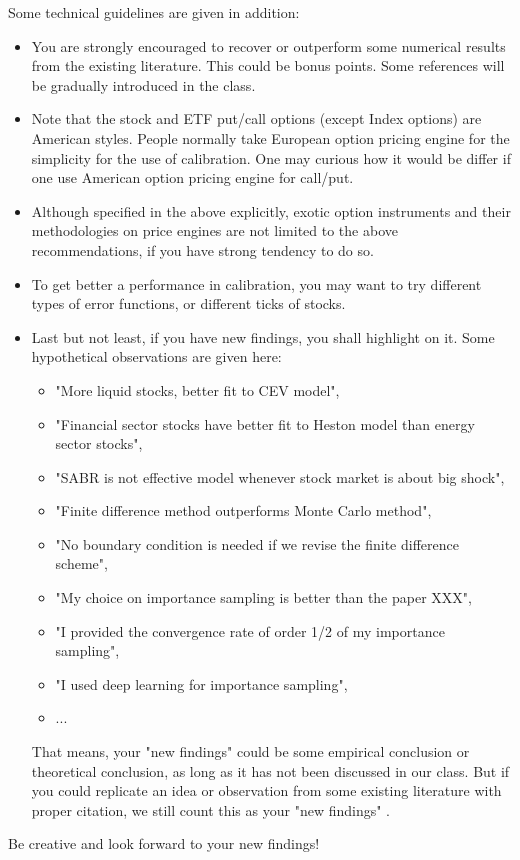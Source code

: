 \documentclass{article}
\begin{document}
Some technical guidelines are given in addition:
\begin{itemize}
 \item You are strongly 
 encouraged to recover or outperform 
 some numerical results from the existing literature. 
 This could be bonus points. Some references will be gradually
 introduced in the class.
 
 
\item Note that the stock and ETF put/call options (except Index options) are American styles. People normally take European option pricing engine for the simplicity  for the use of calibration. One may curious how it would be differ if one use American option pricing engine for call/put.



 \item Although specified in the above explicitly, 
 exotic option instruments and their methodologies on price engines are not limited to the above 
 recommendations, 
 if you have strong tendency to do so.
 
  
 \item To get better a performance in calibration, you
may want to try different types of error functions, or different ticks of stocks. 

\item Last but not least, if you have new findings, you shall highlight on it. 
Some hypothetical observations are given here: 
\begin{itemize}
 \item "More liquid stocks, better fit to CEV model", 
 \item 
"Financial sector stocks have better fit to Heston model than energy sector stocks", 
\item 
"SABR is not effective model whenever stock market is about big shock", 
\item 
"Finite difference method outperforms Monte Carlo method",
\item 
"No boundary condition is needed if we revise the finite difference scheme", 
\item
"My choice on importance sampling is better than 
the paper XXX", 
\item 
"I provided the convergence rate of order 1/2 of my importance sampling",
\item 
"I used deep learning for importance sampling", 
\item ...
\end{itemize}





That means, your "new findings" could be some empirical conclusion 
or theoretical conclusion, as long as it has not been discussed in our class. 
But if you could replicate an idea or observation from some existing literature with proper citation, we still count this as your "new findings" .
\end{itemize}

Be creative and look forward to your new findings!



%
%
%
%
\end{document}

